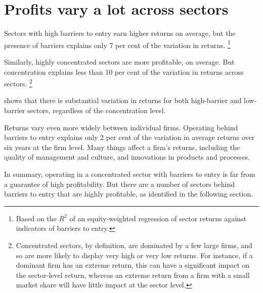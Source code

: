 \newpage

\section{Profits vary a lot across sectors}

Sectors with high barriers to entry earn higher returns on average, but the presence of barriers explains only 7 per cent of the variation in returns.%
    \footnote{Based on the \(R^{2}\) of an equity-weighted regression of sector returns against indicators of barriers to entry.}

Similarly, highly concentrated sectors are more profitable, on average. But concentration explains less than 10 per cent of the variation in returns across sectors.%
    \footnote{Concentrated sectors, by definition, are dominated by a few large firms, and so are more likely to display very high or very low returns.
    For instance, if a dominant firm has an extreme return, this can have a significant impact on the sector-level return, whereas an extreme return from a firm with a small market share will have little impact at the sector level.}
    
 shows that there is substantial variation in returns for both high-barrier and low-barrier sectors, regardless of the concentration level.

Returns vary even more widely between individual firms. Operating behind barriers to entry explains only 2 per cent of the variation in average returns over six years at the firm level. Many things affect a firm's returns, including the quality of management and culture, and  innovations in products and processes.

In summary, operating in a concentrated sector with barriers to entry is far from a guarantee of high profitability. But there are a number of sectors behind barriers to entry that are highly profitable, as identified in the following section.
    
